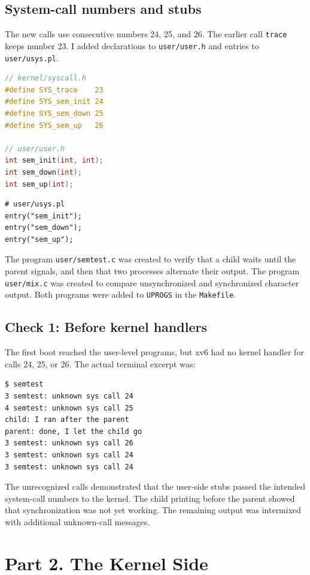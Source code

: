 \documentclass[12pt,a4paper]{article}
\begin{document}
\subsection{System-call numbers and stubs}
The new calls use consecutive numbers 24, 25, and 26. The earlier call \texttt{trace} keeps number 23. I added declarations to \texttt{user/user.h} and entries to \texttt{user/usys.pl}.
\begin{lstlisting}[language=C]
// kernel/syscall.h
#define SYS_trace    23
#define SYS_sem_init 24
#define SYS_sem_down 25
#define SYS_sem_up   26

// user/user.h
int sem_init(int, int);
int sem_down(int);
int sem_up(int);
\end{lstlisting}
\begin{lstlisting}
# user/usys.pl
entry("sem_init");
entry("sem_down");
entry("sem_up");
\end{lstlisting}
The program \texttt{user/semtest.c} was created to verify that a child waits until the parent signals, and then that two processes alternate their output. The program \texttt{user/mix.c} was created to compare unsynchronized and synchronized character output. Both programs were added to \texttt{UPROGS} in the \texttt{Makefile}.

\subsection{Check 1: Before kernel handlers}
The first boot reached the user-level programs, but xv6 had no kernel handler for calls 24, 25, or 26. The actual terminal excerpt was:
\begin{lstlisting}[caption={Figure 1.1 -- Initial semtest output in xv6}]
$ semtest
3 semtest: unknown sys call 24
4 semtest: unknown sys call 25
child: I ran after the parent
parent: done, I let the child go
3 semtest: unknown sys call 26
3 semtest: unknown sys call 24
3 semtest: unknown sys call 24
\end{lstlisting}
The unrecognized calls demonstrated that the user-side stubs passed the intended system-call numbers to the kernel. The child printing before the parent showed that synchronization was not yet working. The remaining output was intermixed with additional unknown-call messages.

\section{Part 2. The Kernel Side}
\end{document}
